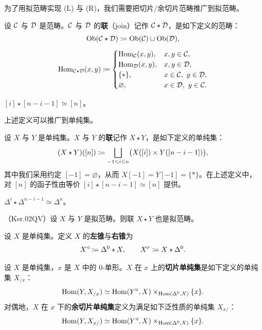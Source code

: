 \nitem\label{L4-8.1} 为了用拟范畴实现 (L) 与 (R)，我们需要把切片/余切片范畴推广到拟范畴。

\begin{definition}\label{L4-8.2}
设 $\mathcal{C}$ 与 $\mathcal{D}$ 是范畴。$\mathcal{C}$ 与 $\mathcal{D}$ 的\textbf{联}（join）记作 $\mathcal{C}\star\mathcal{D}$，是如下定义的范畴：
\[
\operatorname{Ob}(\mathcal{C}\star\mathcal{D})\coloneqq\operatorname{Ob}(\mathcal{C})\sqcup\operatorname{Ob}(\mathcal{D}),
\]
\[
\operatorname{Hom}_{\mathcal{C}\star\mathcal{D}}(x,y)\coloneqq
\begin{cases}
\operatorname{Hom}_{\mathcal{C}}(x,y), & x,y\in\mathcal{C},\\
\operatorname{Hom}_{\mathcal{D}}(x,y), & x,y\in\mathcal{D},\\
\{\ast\}, & x\in\mathcal{C},\ y\in\mathcal{D},\\
\varnothing, & x\in\mathcal{D},\ y\in\mathcal{C}.
\end{cases}
\]
\end{definition}

\begin{example}\label{L4-8.3}
$[i]\star[n-i-1]\simeq[n]$。
\end{example}

\nitem\label{L4-8.4} 上述定义可以推广到单纯集。

\begin{definition}\label{L4-8.5}
设 $X$ 与 $Y$ 是单纯集。$X$ 与 $Y$ 的\textbf{联}记作 $X\star Y$，是如下定义的单纯集：
\[
(X\star Y)([n])\coloneqq\bigsqcup_{-1\le i\le n}\bigl(X([i])\times Y([n-i-1])\bigr),
\]
其中我们采用约定 $[-1]=\varnothing$，从而 $X[-1]=Y[-1]=\{\ast\}$。在上述定义中，对 $[n]$ 的函子性由等价 $[i]\star[n-i-1]\simeq[n]$ 提供。
\end{definition}

\begin{example}\label{L4-8.6}
$\Delta^i\star\Delta^{n-i-1}\simeq\Delta^n$。
\end{example}

\begin{proposition}\label{L4-8.7}
（Ker.02QV）设 $X$ 与 $Y$ 是拟范畴。则联 $X\star Y$ 也是拟范畴。
\end{proposition}

\begin{definition}\label{L4-8.8}
设 $X$ 是单纯集。定义 $X$ 的\textbf{左锥}与\textbf{右锥}为
\[
X^{\triangleleft}\coloneqq\Delta^0\star X,
\qquad
X^{\triangleright}\coloneqq X\star\Delta^0.
\]
\end{definition}

\begin{definition}\label{L4-8.9}
设 $X$ 是单纯集，$x$ 是 $X$ 中的 $0$-单形。$X$ 在 $x$ 上的\textbf{切片单纯集}是如下定义的单纯集 $X_{/x}$：
\[
\operatorname{Hom}(Y,X_{/x})\simeq\operatorname{Hom}(Y^{\triangleright},X)\times_{\operatorname{Hom}(\Delta^0,X)}\{x\}.
\]
对偶地，$X$ 在 $x$ 下的\textbf{余切片单纯集}定义为满足如下泛性质的单纯集 $X_{x/}$：
\[
\operatorname{Hom}(Y,X_{x/})\simeq\operatorname{Hom}(Y^{\triangleleft},X)\times_{\operatorname{Hom}(\Delta^0,X)}\{x\}.
\]
\end{definition}

